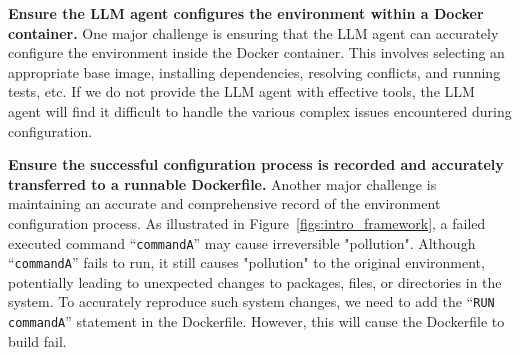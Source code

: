 

\textbf{Ensure the LLM agent configures the environment within a Docker container.} One major challenge is ensuring that the LLM agent can accurately configure the environment inside the Docker container. This involves selecting an appropriate base image, installing dependencies, resolving conflicts, and running tests, etc. If we do not provide the LLM agent with effective tools, the LLM agent will find it difficult to handle the various complex issues encountered during configuration.

\textbf{Ensure the successful configuration process is recorded and accurately transferred to a runnable Dockerfile.} Another major challenge is maintaining an accurate and comprehensive record of the environment configuration process.
As illustrated in Figure~\ref{figs:intro_framework}, a failed executed command ``\texttt{commandA}'' may cause irreversible "pollution".
Although ``\texttt{commandA}'' fails to run, it still causes "pollution" to the original environment, potentially leading to unexpected changes to packages, files, or directories in the system. To accurately reproduce such system changes, we need to add the ``\texttt{RUN commandA}'' statement in the Dockerfile. However, this will cause the Dockerfile to build fail.

